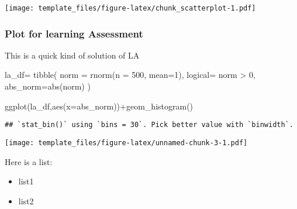 \documentclass[
]{article}
\newenvironment{Shaded}{\begin{snugshade}}{\end{snugshade}}
\newcommand{\AttributeTok}[1]{\textcolor[rgb]{0.77,0.63,0.00}{#1}}
\newcommand{\DecValTok}[1]{\textcolor[rgb]{0.00,0.00,0.81}{#1}}
\newcommand{\FunctionTok}[1]{\textcolor[rgb]{0.00,0.00,0.00}{#1}}
\newcommand{\NormalTok}[1]{#1}
\newcommand{\OtherTok}[1]{\textcolor[rgb]{0.56,0.35,0.01}{#1}}
\newcommand{\SpecialCharTok}[1]{\textcolor[rgb]{0.00,0.00,0.00}{#1}}
\providecommand{\tightlist}{%
  \setlength{\itemsep}{0pt}\setlength{\parskip}{0pt}}
\begin{document}
\texttt{[image: template\_files/figure-latex/chunk\_scatterplot-1.pdf]}

\hypertarget{plot-for-learning-assessment}{%
\subsubsection{Plot for learning
Assessment}\label{plot-for-learning-assessment}}

This is a quick kind of solution of LA

\begin{Shaded}
\begin{Highlighting}[]
\NormalTok{ la\_df}\OtherTok{=}
  \FunctionTok{tibble}\NormalTok{(}
    \AttributeTok{norm =} \FunctionTok{rnorm}\NormalTok{(}\AttributeTok{n =} \DecValTok{500}\NormalTok{, }\AttributeTok{mean=}\DecValTok{1}\NormalTok{),}
    \AttributeTok{logical=}\NormalTok{ norm }\SpecialCharTok{\textgreater{}} \DecValTok{0}\NormalTok{,}
    \AttributeTok{abs\_norm=}\FunctionTok{abs}\NormalTok{(norm)}
\NormalTok{  )}

\FunctionTok{ggplot}\NormalTok{(la\_df,}\FunctionTok{aes}\NormalTok{(}\AttributeTok{x=}\NormalTok{abs\_norm))}\SpecialCharTok{+}\FunctionTok{geom\_histogram}\NormalTok{()}
\end{Highlighting}
\end{Shaded}

\begin{verbatim}
## `stat_bin()` using `bins = 30`. Pick better value with `binwidth`.
\end{verbatim}

\texttt{[image: template\_files/figure-latex/unnamed-chunk-3-1.pdf]}

Here is a list:

\begin{itemize}
\tightlist
\item
  list1
\item
  list2
\end{itemize}
\end{document}

